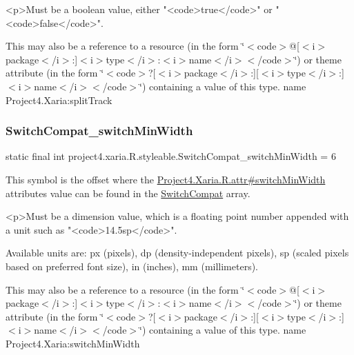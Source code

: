 \begin{DoxyVerb}      <p>Must be a boolean value, either "<code>true</code>" or "<code>false</code>".
\end{DoxyVerb}
 

This may also be a reference to a resource (in the form \char`\"{}$<$code$>$@\mbox{[}$<$i$>$package$<$/i$>$\+:\mbox{]}$<$i$>$type$<$/i$>$\+:$<$i$>$name$<$/i$>$$<$/code$>$\char`\"{}) or theme attribute (in the form \char`\"{}$<$code$>$?\mbox{[}$<$i$>$package$<$/i$>$\+:\mbox{]}\mbox{[}$<$i$>$type$<$/i$>$\+:\mbox{]}$<$i$>$name$<$/i$>$$<$/code$>$\char`\"{}) containing a value of this type.  name Project4.\+Xaria\+:split\+Track \mbox{\label{classproject4_1_1xaria_1_1R_1_1styleable_aecb92273fe1bfad399b3793d1061e0b7}} 
\subsubsection{\texorpdfstring{Switch\+Compat\+\_\+switch\+Min\+Width}{SwitchCompat\_switchMinWidth}}
{\footnotesize\ttfamily static final int project4.\+xaria.\+R.\+styleable.\+Switch\+Compat\+\_\+switch\+Min\+Width = 6\hspace{0.3cm}{\ttfamily [static]}}

This symbol is the offset where the \hyperlink{}{Project4.\+Xaria.\+R.\+attr\#switch\+Min\+Width} attribute\textquotesingle{}s value can be found in the \hyperlink{classproject4_1_1xaria_1_1R_1_1styleable_a15d9950df3a97e57d9c57e4c4b7e8e87}{Switch\+Compat} array.

\begin{DoxyVerb}      <p>Must be a dimension value, which is a floating point number appended with a unit such as "<code>14.5sp</code>".
\end{DoxyVerb}
 Available units are\+: px (pixels), dp (density-\/independent pixels), sp (scaled pixels based on preferred font size), in (inches), mm (millimeters). 

This may also be a reference to a resource (in the form \char`\"{}$<$code$>$@\mbox{[}$<$i$>$package$<$/i$>$\+:\mbox{]}$<$i$>$type$<$/i$>$\+:$<$i$>$name$<$/i$>$$<$/code$>$\char`\"{}) or theme attribute (in the form \char`\"{}$<$code$>$?\mbox{[}$<$i$>$package$<$/i$>$\+:\mbox{]}\mbox{[}$<$i$>$type$<$/i$>$\+:\mbox{]}$<$i$>$name$<$/i$>$$<$/code$>$\char`\"{}) containing a value of this type.  name Project4.\+Xaria\+:switch\+Min\+Width \mbox{\label{classproject4_1_1xaria_1_1R_1_1styleable_a42e6a70d6b1f16cdf82c30ba3a3ac3bd}} 
